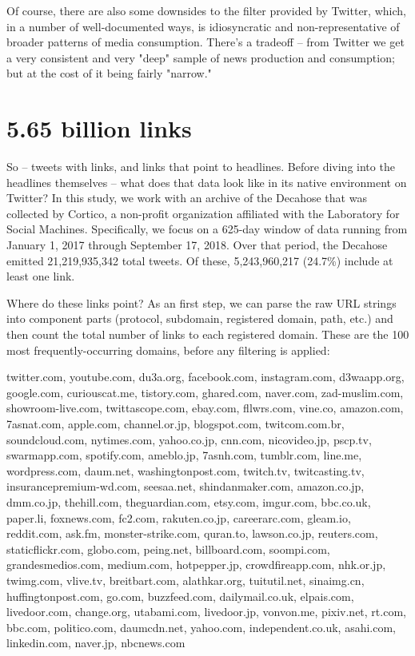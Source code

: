 \documentclass{scrartcl}
\begin{document}
Of course, there are also some downsides to the filter provided by Twitter, which, in a number of well-documented ways, is idiosyncratic and non-representative of broader patterns of media consumption. There's a tradeoff -- from Twitter we get a very consistent and very "deep" sample of news production and consumption; but at the cost of it being fairly "narrow."

\section{5.65 billion links}

So -- tweets with links, and links that point to headlines. Before diving into the headlines themselves -- what does that data look like in its native environment on Twitter? In this study, we work with an archive of the Decahose that was collected by Cortico, a non-profit organization affiliated with the Laboratory for Social Machines. Specifically, we focus on a 625-day window of data running from January 1, 2017 through September 17, 2018. Over that period, the Decahose emitted 21,219,935,342 total tweets. Of these, 5,243,960,217 (24.7\%) include at least one link.

Where do these links point? As an first step, we can parse the raw URL strings into component parts (protocol, subdomain, registered domain, path, etc.) and then count the total number of links to each registered domain. These are the 100 most frequently-occurring domains, before any filtering is applied:

\begin{displayquote}
\scriptsize \raggedright twitter.com, youtube.com, du3a.org, facebook.com, instagram.com, d3waapp.org, google.com, curiouscat.me, tistory.com, ghared.com, naver.com, zad-muslim.com, showroom-live.com, twittascope.com, ebay.com, fllwrs.com, vine.co, amazon.com, 7asnat.com, apple.com, channel.or.jp, blogspot.com, twitcom.com.br, soundcloud.com, nytimes.com, yahoo.co.jp, cnn.com, nicovideo.jp, pscp.tv, swarmapp.com, spotify.com, ameblo.jp, 7asnh.com, tumblr.com, line.me, wordpress.com, daum.net, washingtonpost.com, twitch.tv, twitcasting.tv, insurancepremium-wd.com, seesaa.net, shindanmaker.com, amazon.co.jp, dmm.co.jp, thehill.com, theguardian.com, etsy.com, imgur.com, bbc.co.uk, paper.li, foxnews.com, fc2.com, rakuten.co.jp, careerarc.com, gleam.io, reddit.com, ask.fm, monster-strike.com, quran.to, lawson.co.jp, reuters.com, staticflickr.com, globo.com, peing.net, billboard.com, soompi.com, grandesmedios.com, medium.com, hotpepper.jp, crowdfireapp.com, nhk.or.jp, twimg.com, vlive.tv, breitbart.com, alathkar.org, tuitutil.net, sinaimg.cn, huffingtonpost.com, go.com, buzzfeed.com, dailymail.co.uk, elpais.com, livedoor.com, change.org, utabami.com, livedoor.jp, vonvon.me, pixiv.net, rt.com, bbc.com, politico.com, daumcdn.net, yahoo.com, independent.co.uk, asahi.com, linkedin.com, naver.jp, nbcnews.com
\end{displayquote}
\end{document}

